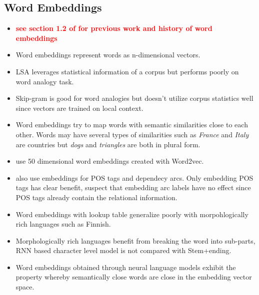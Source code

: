 \documentclass[12pt,a4paper,english
]{tutthesis}
\begin{document}
\subsection{Word Embeddings}
\begin{itemize}
\item \textbf{\textcolor{red}{see section 1.2 of \cite{Mikolov2013} for previous work and history of word embeddings}}
\item Word embeddings represent words as n-dimensional vectors. \cite{Mikolov2013}
\item LSA leverages statistical information of a corpus but performs poorly on word analogy task. \cite{Pennington2014}
\item Skip-gram is good for word analogies but doesn't utilize corpus statistics well since vectors are trained on local context. \cite{Pennington2014}
\item Word embeddings try to map words with semantic similarities close to each other. Words may have several types of similarities such as \textit{France} and \textit{Italy} are countries but \textit{dogs} and \textit{triangles} are both in plural form. \cite{Mikolov2013a}
\item \cite{Chen2014} use 50 dimensional word embeddings created with Word2vec.
\item \cite{Chen2014} also use embeddings for POS tags and dependecy arcs. Only embedding POS tags has clear benefit, \cite{Chen2014} suspect that embedding arc labels have no effect since POS tags already contain the relational information.
\item Word embeddings with lookup table generalize poorly with morpohlogically rich languages such as Finnish. \cite{Takala2016}
\item Morphologically rich languages benefit from breaking the word into sub-parts, RNN based character level model is not compared with Stem+ending. \cite{Takala2016}
\item Word embeddings obtained through neural language models exhibit the property whereby semantically close words are close in the embedding vector space. \cite{Kim2016}
\end{itemize}
\end{document}
